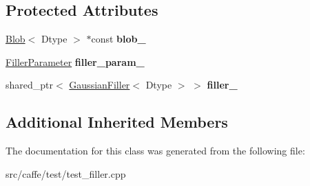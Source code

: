 \subsection*{Protected Attributes}
\begin{DoxyCompactItemize}
\item 
\mbox{\label{classcaffe_1_1_gaussian_filler_test_a2bf1c6d059d5a2ddd346582a6e8e5f75}} 
\mbox{\hyperlink{classcaffe_1_1_blob}{Blob}}$<$ Dtype $>$ $\ast$const {\bfseries blob\+\_\+}
\item 
\mbox{\label{classcaffe_1_1_gaussian_filler_test_a9043c61c0efe496faf5e8ba603d79395}} 
\mbox{\hyperlink{classcaffe_1_1_filler_parameter}{Filler\+Parameter}} {\bfseries filler\+\_\+param\+\_\+}
\item 
\mbox{\label{classcaffe_1_1_gaussian_filler_test_a742c237b4c3e81179d080f4122f2e92e}} 
shared\+\_\+ptr$<$ \mbox{\hyperlink{classcaffe_1_1_gaussian_filler}{Gaussian\+Filler}}$<$ Dtype $>$ $>$ {\bfseries filler\+\_\+}
\end{DoxyCompactItemize}
\subsection*{Additional Inherited Members}


The documentation for this class was generated from the following file\+:\begin{DoxyCompactItemize}
\item 
src/caffe/test/test\+\_\+filler.\+cpp\end{DoxyCompactItemize}
